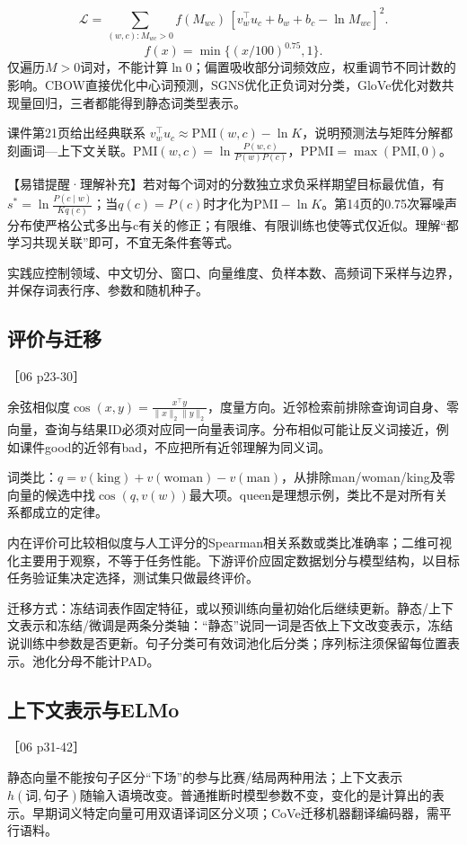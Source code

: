 \documentclass[UTF8,a4paper,zihao=-4,fontset=windows]{ctexart}
\newcommand{\source}[1]{{\small #1}\par}
\begin{document}
\[\mathcal L=\sum_{(w,c):M_{wc}>0}f(M_{wc})\,[v_w^\top u_c+b_w+b_c-\ln M_{wc}]^2.\]
\[f(x)=\min\{(x/100)^{0.75},1\}.\]
仅遍历$M>0$词对，不能计算$\ln0$；偏置吸收部分词频效应，权重调节不同计数的影响。CBOW直接优化中心词预测，SGNS优化正负词对分类，GloVe优化对数共现量回归，三者都能得到静态词类型表示。

课件第21页给出经典联系 $v_w^\top u_c\approx\mathrm{PMI}(w,c)-\ln K$，说明预测法与矩阵分解都刻画词---上下文关联。$\mathrm{PMI}(w,c)=\ln\frac{P(w,c)}{P(w)P(c)}$，$\mathrm{PPMI}=\max(\mathrm{PMI},0)$。

【易错提醒·理解补充】若对每个词对的分数独立求负采样期望目标最优值，有$s^*=\ln\frac{P(c\mid w)}{Kq(c)}$；当$q(c)=P(c)$时才化为$\mathrm{PMI}-\ln K$。第14页的0.75次幂噪声分布使严格公式多出与c有关的修正；有限维、有限训练也使等式仅近似。理解“都学习共现关联”即可，不宜无条件套等式。

实践应控制领域、中文切分、窗口、向量维度、负样本数、高频词下采样与边界，并保存词表行序、参数和随机种子。

\subsection{评价与迁移}
\source{［06 p23-30］}
余弦相似度$\cos(x,y)=\frac{x^\top y}{\lVert x\rVert_2\lVert y\rVert_2}$，度量方向。近邻检索前排除查询词自身、零向量，查询与结果ID必须对应同一向量表词序。分布相似可能让反义词接近，例如课件good的近邻有bad，不应把所有近邻理解为同义词。

词类比：$q=v(\mathrm{king})+v(\mathrm{woman})-v(\mathrm{man})$，从排除man/\allowbreak{}woman/\allowbreak{}king及零向量的候选中找$\cos(q,v(w))$最大项。queen是理想示例，类比不是对所有关系都成立的定律。

内在评价可比较相似度与人工评分的Spearman相关系数或类比准确率；二维可视化主要用于观察，不等于任务性能。下游评价应固定数据划分与模型结构，以目标任务验证集决定选择，测试集只做最终评价。

迁移方式：冻结词表作固定特征，或以预训练向量初始化后继续更新。静态/\allowbreak{}上下文表示和冻结/\allowbreak{}微调是两条分类轴：“静态”说同一词是否依上下文改变表示，冻结说训练中参数是否更新。句子分类可有效词池化后分类；序列标注须保留每位置表示。池化分母不能计PAD。

\subsection{上下文表示与ELMo}
\source{［06 p31-42］}
静态向量不能按句子区分“下场”的参与比赛/\allowbreak{}结局两种用法；上下文表示$h(\text{词},\text{句子})$随输入语境改变。普通推断时模型参数不变，变化的是计算出的表示。早期词义特定向量可用双语译词区分义项；CoVe迁移机器翻译编码器，需平行语料。
\end{document}
